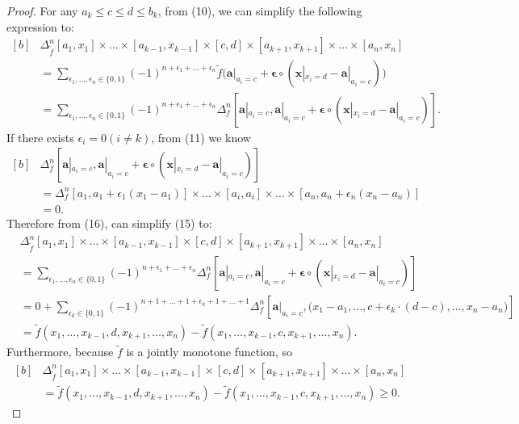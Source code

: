 \documentclass{ijclclp}
\begin{document}
\begin{proof}
    For any \(a_k\leq c\leq d\leq b_k\), from (10), we can simplify the following expression to:
    \begin{equation}
        \begin{aligned}[b]
            &\Delta_{\widetilde{f}}^n[a_1,x_1]\times\dots\times[a_{k-1},x_{k-1}]\times[c,d]\times[a_{k+1},x_{k+1}]\times\dots\times[a_n,x_n]\\
            &=\sum_{\epsilon_1,\dots,\epsilon_n\in\{0,1\}}(-1)^{n+\epsilon_1+\dots+\epsilon_n}\widetilde{f}\big(\boldsymbol{a}|_{a_i=c}+\boldsymbol{\epsilon}\circ(\boldsymbol{x}|_{x_i=d}-\boldsymbol{a}|_{a_i=c})\big)\\
            &=\sum_{\epsilon_1,\dots,\epsilon_n\in\{0,1\}}(-1)^{n+\epsilon_1+\dots+\epsilon_n}\Delta_f^n[\boldsymbol{a}|_{a_i=c},\boldsymbol{a}|_{a_i=c}+\boldsymbol{\epsilon}\circ(\boldsymbol{x}|_{x_i=d}-\boldsymbol{a}|_{a_i=c})].
        \end{aligned}
    \end{equation}
    If there exists \(\epsilon_i=0(i\neq k)\), from (11) we know
    \begin{equation}
        \begin{aligned}[b]
            &\Delta_f^n[\boldsymbol{a}|_{a_i=c},\boldsymbol{a}|_{a_i=c}+\boldsymbol{\epsilon}\circ(\boldsymbol{x}|_{x_i=d}-\boldsymbol{a}|_{a_i=c})]\\
            &=\Delta_f^n[a_1,a_1+\epsilon_1(x_1-a_1)]\times\dots\times[a_i,a_i]\times\dots\times[a_n,a_n+\epsilon_n(x_n-a_n)]\\
            &=0.
        \end{aligned}
    \end{equation}
    Therefore from (16), can simplify (15) to:
    \begin{align*}
        &\Delta_{\widetilde{f}}^n[a_1,x_1]\times\dots\times[a_{k-1},x_{k-1}]\times[c,d]\times[a_{k+1},x_{k+1}]\times\dots\times[a_n,x_n]\\
        &=\sum_{\epsilon_1,\dots,\epsilon_n\in\{0,1\}}(-1)^{n+\epsilon_1+\dots+\epsilon_n}\Delta_f^n[\boldsymbol{a}|_{a_i=c},\boldsymbol{a}|_{a_i=c}+\boldsymbol{\epsilon}\circ(\boldsymbol{x}|_{x_i=d}-\boldsymbol{a}|_{a_i=c})]\\
        &=0+\sum_{\epsilon_k\in\{0,1\}}(-1)^{n+1+\dots+1+\epsilon_k+1+\dots+1}\Delta_f^n[\boldsymbol{a}|_{a_i=c},\big(x_1-a_1,\dots,c+\epsilon_k\cdot(d-c),\dots,x_n-a_n\big)]\\
        &=\widetilde{f}(x_1,\dots,x_{k-1},d,x_{k+1},\dots,x_n)-\widetilde{f}(x_1,\dots,x_{k-1},c,x_{k+1},\dots,x_n).
    \end{align*}
    Furthermore, because \(\widetilde{f}\) is a jointly monotone function, so
    \begin{equation}
        \begin{aligned}[b]
            &\Delta_{\widetilde{f}}^n[a_1,x_1]\times\dots\times[a_{k-1},x_{k-1}]\times[c,d]\times[a_{k+1},x_{k+1}]\times\dots\times[a_n,x_n]\\
            &=\widetilde{f}(x_1,\dots,x_{k-1},d,x_{k+1},\dots,x_n)-\widetilde{f}(x_1,\dots,x_{k-1},c,x_{k+1},\dots,x_n)\geq0.
        \end{aligned}      
    \end{equation}


\end{proof}
\end{document}
